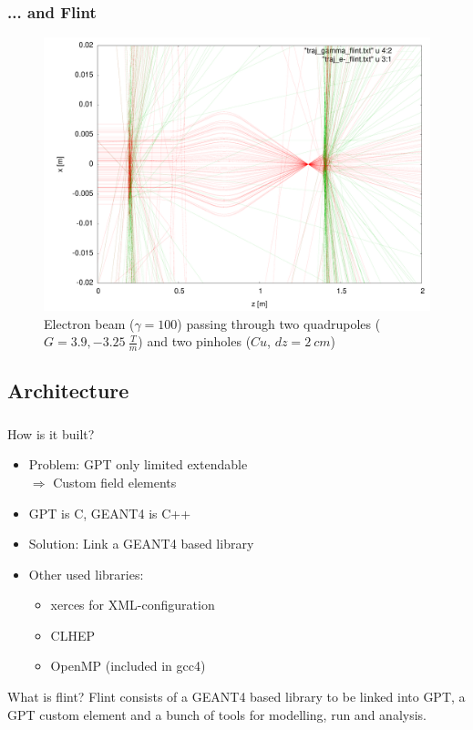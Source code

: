 \documentclass{beamer}
\newcommand{\ident}{\thesection.\thesubsection}
\newcommand{\mysubsection}[1]{\subsection{#1}\label{\ident}}
\newcommand{\ftitle}{\frametitle{\nameref{\ident}}}
\newcommand{\geant}{G{\smaller EANT}4 }
\begin{document}
\begin{frame}
	\frametitle{... and Flint}
	\begin{figure}
		\begin{center}
			\includegraphics[height=0.7\textheight]{img/quadrupole_flint}
			\caption{Electron beam ($\gamma = 100$) passing through two quadrupoles ($G = 3.9, -3.25 ~\frac{T}{m}$) and two pinholes ($Cu$, $dz = 2~cm$)}
		\end{center}
	\end{figure}
\end{frame}

\mysubsection{Architecture}

\begin{frame}
	\ftitle
	\begin{block}{How is it built?}
		\begin{itemize}
			\item Problem: GPT only limited extendable\\
				$\Rightarrow$ Custom field elements
			\item GPT is C, \geant is C++
			\item Solution: Link a \geant based library
			\item Other used libraries:
				\begin{itemize}
					\item xerces for XML-configuration
					\item CLHEP
					\item OpenMP (included in gcc4)
				\end{itemize}
		\end{itemize}
	\end{block}
	\pause
	\begin{exampleblock}{What is flint?}
		Flint consists of a \geant based library to be linked into GPT, a GPT custom element and a bunch of tools for modelling, run and analysis.
	\end{exampleblock}
\end{frame}
\end{document}
